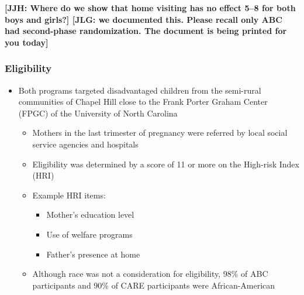 \documentclass[static]{JJH-Beamer}
\begin{document}
\textbf{[JJH: Where do we show that home visiting has no effect 5--8 for both boys and girls?] [JLG: we documented this. Please recall only ABC had second-phase randomization. The document is being printed for you today]}
\clearpage
\begin{frame}
 \addtocounter{framenumber}{-1}
\frametitle{Eligibility}

\begin{itemize}
\item Both programs targeted disadvantaged children from the semi-rural communities of Chapel Hill close to the Frank Porter Graham Center (FPGC) of the University of North Carolina
	\begin{itemize}
	\item Mothers in the last trimester of pregnancy were referred by local social service agencies and hospitals 		
	\item Eligibility was determined by a score of 11 or more on the High-risk Index (HRI)
	\item Example HRI items:
		\begin{itemize}
		\item Mother's education level
		\item Use of welfare programs
		\item Father's presence at home
		\end{itemize}
    \item Although race was not a consideration for eligibility, 98\% of ABC participants and 90\% of CARE participants were African-American
	\end{itemize}
\end{itemize}

\end{frame}
\end{document}
